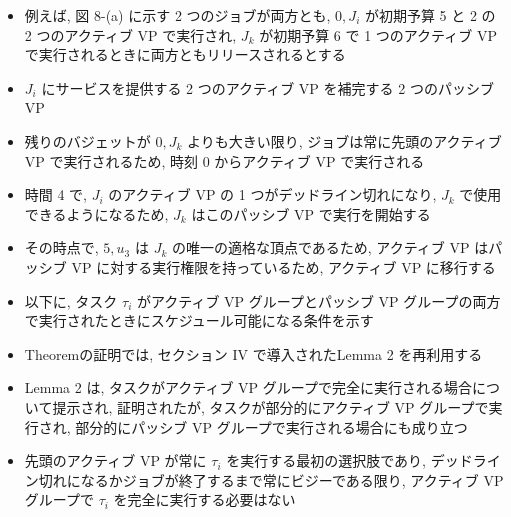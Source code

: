 \begin{frame}{}
    \begin{itemize}
        \item 例えば, 図 8-(a) に示す 2 つのジョブが両方とも, $0, J_{i}$ が初期予算 5 と 2 の 2 つのアクティブ VP で実行され, $J_{k}$ が初期予算 6 で 1 つのアクティブ VP で実行されるときに両方ともリリースされるとする
        \item $J_{i}$ にサービスを提供する 2 つのアクティブ VP を補完する 2 つのパッシブ VP
        \item 残りのバジェットが $0, J_{k}$ よりも大きい限り, ジョブは常に先頭のアクティブ VP で実行されるため, 時刻 0 からアクティブ VP で実行される
        \item 時間 4 で,  $J_{i}$ のアクティブ VP の 1 つがデッドライン切れになり, $J_{k}$ で使用できるようになるため, $J_{k}$ はこのパッシブ VP で実行を開始する
        \item その時点で, $5, u_{3}$ は $J_{k}$ の唯一の適格な頂点であるため, アクティブ VP はパッシブ VP に対する実行権限を持っているため, アクティブ VP に移行する
    \end{itemize}
\end{frame}

\begin{frame}{}
    \begin{itemize}
        \item 以下に, タスク $\tau_{i}$ がアクティブ VP グループとパッシブ VP グループの両方で実行されたときにスケジュール可能になる条件を示す
        \item Theoremの証明では, セクション IV で導入されたLemma 2 を再利用する
        \item Lemma 2 は, タスクがアクティブ VP グループで完全に実行される場合について提示され, 証明されたが, タスクが部分的にアクティブ VP グループで実行され, 部分的にパッシブ VP グループで実行される場合にも成り立つ
        \item 先頭のアクティブ VP が常に $\tau_{i}$ を実行する最初の選択肢であり, デッドライン切れになるかジョブが終了するまで常にビジーである限り, アクティブ VP グループで $\tau_{i}$ を完全に実行する必要はない
    \end{itemize}
\end{frame}

